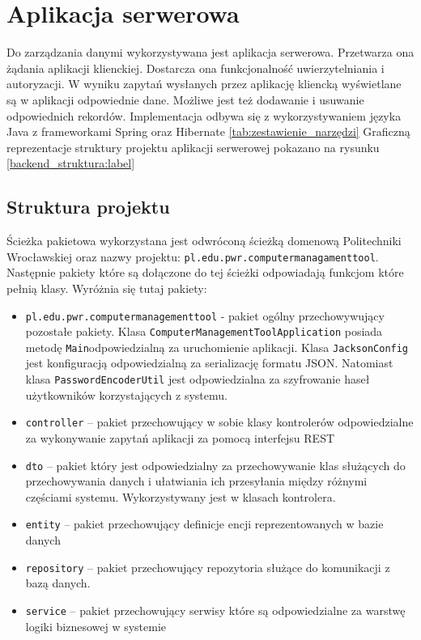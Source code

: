 \section{Aplikacja serwerowa}
Do zarządzania danymi wykorzystywana jest aplikacja serwerowa. Przetwarza ona żądania aplikacji klienckiej. Dostarcza ona funkcjonalność uwierzytelniania i autoryzacji. W wyniku zapytań wysłanych przez aplikację kliencką wyświetlane są w aplikacji odpowiednie dane. Możliwe jest też dodawanie i usuwanie odpowiednich rekordów. Implementacja odbywa się z wykorzystywaniem języka Java z frameworkami Spring oraz Hibernate \ref{tab:zestawienie_narzędzi} Graficzną reprezentacje struktury projektu aplikacji serwerowej pokazano na rysunku \ref{backend_struktura:label}

\subsection{Struktura projektu}
Ścieżka pakietowa wykorzystana jest odwróconą ścieżką domenową Politechniki Wrocławskiej oraz nazwy projektu: \texttt{pl.edu.pwr.computermanagamenttool}. Następnie pakiety które są dołączone do tej ścieżki odpowiadają funkcjom które pełnią klasy. Wyróżnia się tutaj pakiety:
\begin{itemize} %
\item \texttt{pl.edu.pwr.computermanagementtool} - pakiet ogólny przechowywujący pozostałe pakiety. Klasa \texttt{ComputerManagementToolApplication} posiada metodę \texttt{Main}odpowiedzialną za uruchomienie aplikacji. Klasa \texttt{JacksonConfig} jest konfiguracją odpowiedzialną za serializację formatu JSON. Natomiast klasa \texttt{PasswordEncoderUtil} jest odpowiedzialna za szyfrowanie haseł użytkowników korzystających z systemu.
\item \texttt{controller} -- pakiet przechowujący w sobie klasy kontrolerów odpowiedzialne za wykonywanie zapytań aplikacji za pomocą interfejsu REST
\item \texttt{dto} -- pakiet który jest odpowiedzialny za przechowywanie klas służących do przechowywania danych i ułatwiania ich przesyłania między różnymi częściami systemu. Wykorzystywany jest w klasach kontrolera.
\item \texttt{entity} -- pakiet przechowujący definicje encji reprezentowanych w bazie danych
\item \texttt{repository} -- pakiet przechowujący repozytoria służące do komunikacji z bazą danych.
\item \texttt{service} -- pakiet przechowujący serwisy które są odpowiedzialne za warstwę logiki biznesowej w systemie
\end{itemize}


